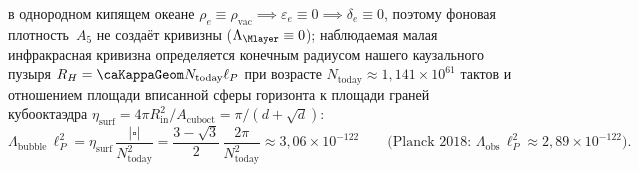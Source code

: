 \begin{proposition}[Гравитационный канал: деформация Редже, отклонение света $\theta_{\mathrm{def}}=4GM/(c^2 b)$, две поляризации и масштаб $\Lambda$]
\begin{enumerate}[noitemsep]
  в однородном кипящем океане $\rho_e\equiv\rho_{\mathrm{vac}} \implies \varepsilon_e\equiv 0 \implies \delta_e\equiv 0$, поэтому фоновая плотность~$A_5$ не создаёт кривизны ($\Lambda_{\Mlayer}\equiv 0$); наблюдаемая малая инфракрасная кривизна определяется конечным радиусом нашего каузального пузыря $R_H = \caKappaGeom N_{\mathrm{today}}\ell_P$ при возрасте $N_{\mathrm{today}}\approx 1{,}141\times 10^{61}$ тактов и отношением площади вписанной сферы горизонта к площади граней кубооктаэдра $\eta_{\mathrm{surf}} = 4\pi R_{\mathrm{in}}^2/A_{\mathrm{cuboct}} = \pi/(d+\sqrt{d})$:
  \[
    \Lambda_{\mathrm{bubble}}\,\ell_P^2 = \eta_{\mathrm{surf}}\,\frac{|\square|}{N_{\mathrm{today}}^2} = \frac{3-\sqrt{3}}{2}\,\frac{2\pi}{N_{\mathrm{today}}^2} \approx 3{,}06\times 10^{-122}
    \qquad\bigl(\text{Planck 2018: }\Lambda_{\mathrm{obs}}\,\ell_P^2 \approx 2{,}89\times 10^{-122}\bigr).
  \]
\end{enumerate}
\end{proposition}

